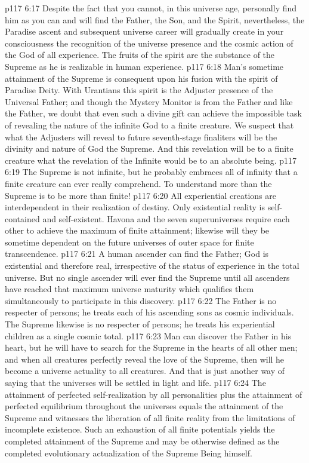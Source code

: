 \vs p117 6:17 Despite the fact that you cannot, in this universe age, personally find him as you can and will find the Father, the Son, and the Spirit, nevertheless, the Paradise ascent and subsequent universe career will gradually create in your consciousness the recognition of the universe presence and the cosmic action of the God of all experience. The fruits of the spirit are the substance of the Supreme as he is realizable in human experience.
\vs p117 6:18 Man’s sometime attainment of the Supreme is consequent upon his fusion with the spirit of Paradise Deity. With Urantians this spirit is the Adjuster presence of the Universal Father; and though the Mystery Monitor is from the Father and like the Father, we doubt that even such a divine gift can achieve the impossible task of revealing the nature of the infinite God to a finite creature. We suspect that what the Adjusters will reveal to future seventh\hyp{}stage finaliters will be the divinity and nature of God the Supreme. And this revelation will be to a finite creature what the revelation of the Infinite would be to an absolute being.
\vs p117 6:19 The Supreme is not infinite, but he probably embraces all of infinity that a finite creature can ever really comprehend. To understand more than the Supreme is to be more than finite!
\vs p117 6:20 All experiential creations are interdependent in their realization of destiny. Only existential reality is self\hyp{}contained and self\hyp{}existent. Havona and the seven superuniverses require each other to achieve the maximum of finite attainment; likewise will they be sometime dependent on the future universes of outer space for finite transcendence.
\vs p117 6:21 A human ascender can find the Father; God is existential and therefore real, irrespective of the status of experience in the total universe. But no single ascender will ever find the Supreme until all ascenders have reached that maximum universe maturity which qualifies them simultaneously to participate in this discovery.
\vs p117 6:22 The Father is no respecter of persons; he treats each of his ascending sons as cosmic individuals. The Supreme likewise is no respecter of persons; he treats his experiential children as a single cosmic total.
\vs p117 6:23 Man can discover the Father in his heart, but he will have to search for the Supreme in the hearts of all other men; and when all creatures perfectly reveal the love of the Supreme, then will he become a universe actuality to all creatures. And that is just another way of saying that the universes will be settled in light and life.
\vs p117 6:24 The attainment of perfected self\hyp{}realization by all personalities plus the attainment of perfected equilibrium throughout the universes equals the attainment of the Supreme and witnesses the liberation of all finite reality from the limitations of incomplete existence. Such an exhaustion of all finite potentials yields the completed attainment of the Supreme and may be otherwise defined as the completed evolutionary actualization of the Supreme Being himself.
